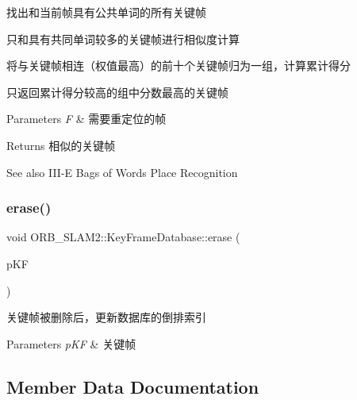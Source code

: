 \begin{DoxyEnumerate}
\item 找出和当前帧具有公共单词的所有关键帧
\item 只和具有共同单词较多的关键帧进行相似度计算
\item 将与关键帧相连（权值最高）的前十个关键帧归为一组，计算累计得分
\item 只返回累计得分较高的组中分数最高的关键帧 
\begin{DoxyParams}{Parameters}
{\em F} & 需要重定位的帧 \\
\hline
\end{DoxyParams}
\begin{DoxyReturn}{Returns}
相似的关键帧 
\end{DoxyReturn}
\begin{DoxySeeAlso}{See also}
I\+I\+I-\/E Bags of Words Place Recognition 
\end{DoxySeeAlso}

\end{DoxyEnumerate}\mbox{\label{class_o_r_b___s_l_a_m2_1_1_key_frame_database_aa5b56ae1d1cb827fb4602abd61d77a06}} 
\subsubsection{\texorpdfstring{erase()}{erase()}}
{\footnotesize\ttfamily void O\+R\+B\+\_\+\+S\+L\+A\+M2\+::\+Key\+Frame\+Database\+::erase (\begin{DoxyParamCaption}\item[{\mbox{\hyperlink{class_o_r_b___s_l_a_m2_1_1_key_frame}{Key\+Frame}} $\ast$}]{p\+KF }\end{DoxyParamCaption})}



关键帧被删除后，更新数据库的倒排索引 


\begin{DoxyParams}{Parameters}
{\em p\+KF} & 关键帧 \\
\hline
\end{DoxyParams}


\subsection{Member Data Documentation}
\mbox{\label{class_o_r_b___s_l_a_m2_1_1_key_frame_database_a31fc30f1474b8c97d81c96135e6912a1}} 
